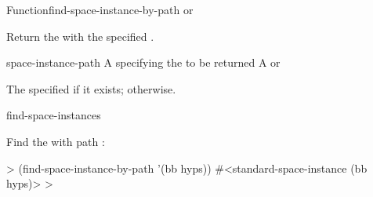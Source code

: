 \documentclass[10pt,twoside,english,pdftex]{article}
\begin{document}
\begin{functiondoc}{Function}{find-space-instance-by-path}%
  {
    \returns{}  or \nil}

\fnsyntax

\fnpurpose Return the  with the specified
. 

\fnpackage {}

\fnmodule {}

\fnargs
\begin{args}{space-instance-path}
 A  specifying the
 to be returned 
 A  or \nil{}
\end{args}

\fnreturns The specified  if it exists; \nil{}
otherwise.

\begin{alsos}{find-space-instances}
\end{alsos}

\fnexample
Find the  with path :
%
\W\supp
\begin{example}
  > (find-space-instance-by-path '(bb hyps))
  #<standard-space-instance (bb hyps)>
  >
\end{example}

\end{functiondoc}

\end{document}
